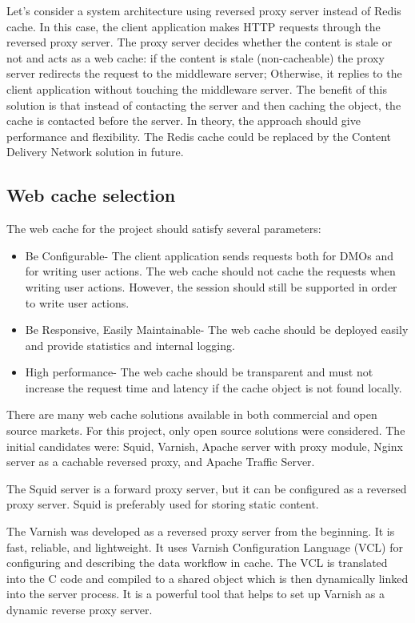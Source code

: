 Let’s consider a system architecture using reversed proxy server instead of Redis cache. In this case, the client application makes HTTP requests through the reversed proxy server. The proxy server decides whether the content is stale or not and acts as a web cache: if the content is stale (non-cacheable) the proxy server redirects the request to the middleware server; Otherwise, it replies to the client application without touching the middleware server. The benefit of this solution is that instead of contacting the server and then caching the object, the cache is contacted before the server. In theory, the approach should give performance and flexibility. The Redis cache could be replaced by the Content Delivery Network solution in future.


\subsection{Web cache selection}

The web cache for the project should satisfy several parameters:
\begin{itemize}
	\item Be Configurable- The client application sends requests both for DMOs and for writing user actions. The web cache should not cache the requests when writing user actions. However, the session should still be supported in order to write user actions. 
	\item Be Responsive, Easily Maintainable- The web cache should be deployed easily and provide statistics and internal logging. 
	\item High performance- The web cache should be transparent and must not increase the request time and latency if the cache object is not found locally. 
\end{itemize}

There are many web cache solutions available in both commercial and open source markets. For this project, only open source solutions were considered. The initial candidates were: Squid, Varnish, Apache server with proxy module, Nginx server as a cachable reversed proxy, and Apache Traffic Server.

The Squid server is a forward proxy server, but it can be configured as a reversed proxy server. Squid is preferably used for storing static content.

The Varnish was developed as a reversed proxy server from the beginning. It is fast, reliable, and lightweight. It uses Varnish Configuration Language (VCL) for configuring and describing the data workflow in cache. The VCL is translated into the C code and compiled to a shared object which is then dynamically linked into the server process. It is a powerful tool that helps to set up Varnish as a dynamic reverse proxy server.


